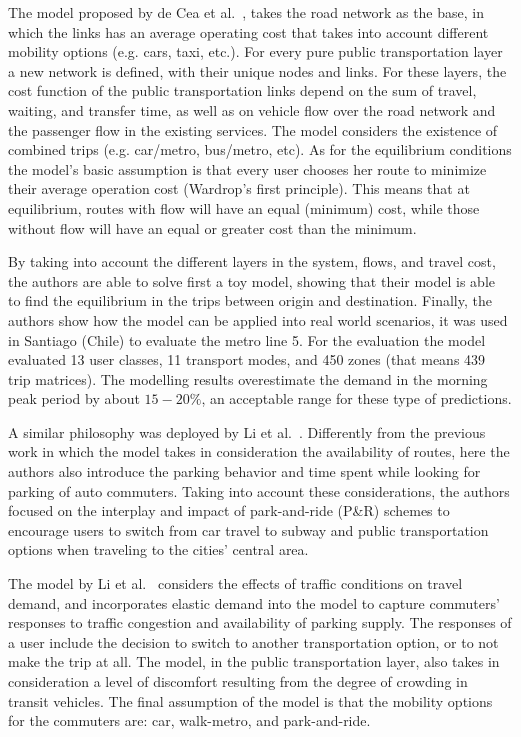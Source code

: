 The model proposed by de Cea et al.~\cite{decea2005equilibrium}, takes the road network as the base, in which the links has an average operating cost that takes into account different mobility options (e.g. cars, taxi, etc.). For every pure public transportation layer a new network is defined, with their unique nodes and links. For these layers, the cost function of the public transportation links depend on the sum of travel, waiting, and transfer time, as well as on vehicle flow over the road network and the passenger flow in the existing services. The model considers the existence of combined trips (e.g. car/metro, bus/metro, etc). As for the equilibrium conditions the model's basic assumption is that every user chooses her route to minimize their average operation cost (Wardrop’s first principle). This means that at equilibrium, routes with flow will have an equal (minimum) cost, while those without flow will have an equal or greater cost than the minimum.

By taking into account the different layers in the system, flows, and travel cost, the authors are able to solve first a toy model, showing that their model is able to find the equilibrium in the trips between origin and destination. Finally, the authors show how the model can be applied into real world scenarios, it was used in Santiago (Chile) to evaluate the metro line 5. For the evaluation the model evaluated 13 user classes, 11 transport modes, and 450 zones (that means 439 trip matrices). The modelling results overestimate the demand in the morning peak period by about $15-20\%$, an acceptable range for these type of predictions.

A similar philosophy was deployed by Li et al.~\cite{li2007parkride}. Differently from the previous work in which the model takes in consideration the availability of routes, here the authors also introduce the parking behavior and time spent while looking for parking of auto commuters. Taking into account these considerations, the authors focused on the interplay and impact of park-and-ride (P\&R) schemes to encourage users to switch from car travel to subway and public transportation options when traveling to the cities' central area. 

The model by Li et al.~\cite{li2007parkride} considers the effects of traffic conditions on travel demand, and incorporates elastic demand into the model to capture commuters’ responses to traffic congestion and availability of parking supply. The responses of a user include the decision to switch to another transportation option, or to not make the trip at all. The model, in the public transportation layer, also takes in consideration a level of discomfort resulting from the degree of crowding in transit vehicles. The final assumption of the model is that the mobility options for the commuters are: car, walk-metro, and park-and-ride.

